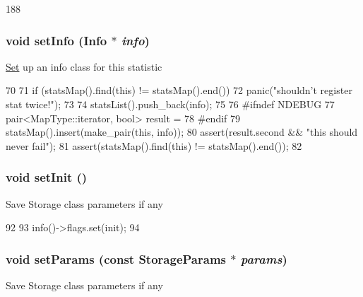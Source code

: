 \begin{DoxyCode}
188 { }
\end{DoxyCode}
\hypertarget{classStats_1_1InfoAccess_aa934ced0a9371cd4be6ef11cb97aebed}{
\subsubsection[{setInfo}]{\setlength{\rightskip}{0pt plus 5cm}void setInfo ({\bf Info} $\ast$ {\em info})}}
\label{classStats_1_1InfoAccess_aa934ced0a9371cd4be6ef11cb97aebed}
\hyperlink{classSet}{Set} up an info class for this statistic 


\begin{DoxyCode}
70 {
71     if (statsMap().find(this) != statsMap().end())
72         panic("shouldn't register stat twice!");
73 
74     statsList().push_back(info);
75 
76 #ifndef NDEBUG
77     pair<MapType::iterator, bool> result =
78 #endif
79         statsMap().insert(make_pair(this, info));
80     assert(result.second && "this should never fail");
81     assert(statsMap().find(this) != statsMap().end());
82 }
\end{DoxyCode}
\hypertarget{classStats_1_1InfoAccess_a05110e334f3c79a4ebaad30aac5c4acd}{
\subsubsection[{setInit}]{\setlength{\rightskip}{0pt plus 5cm}void setInit ()}}
\label{classStats_1_1InfoAccess_a05110e334f3c79a4ebaad30aac5c4acd}
Save Storage class parameters if any 


\begin{DoxyCode}
92 {
93     info()->flags.set(init);
94 }
\end{DoxyCode}
\hypertarget{classStats_1_1InfoAccess_a1cd4fa8eb589bba328e8be930bbe4ec3}{
\subsubsection[{setParams}]{\setlength{\rightskip}{0pt plus 5cm}void setParams (const {\bf StorageParams} $\ast$ {\em params})}}
\label{classStats_1_1InfoAccess_a1cd4fa8eb589bba328e8be930bbe4ec3}
Save Storage class parameters if any 


